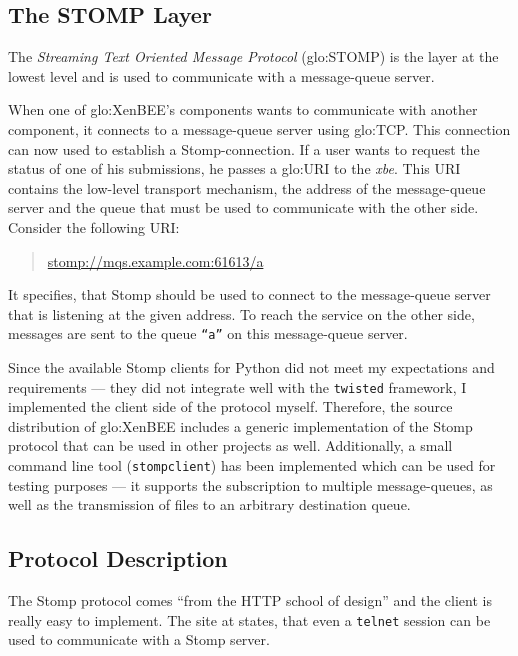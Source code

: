 \subsection{The STOMP Layer}
\label{sec:protocol:stomp}

The  \emph{Streaming  Text  Oriented Message  Protocol}  (\gls{glo:STOMP})
\cite{stomp} is the  layer at the lowest level and  is used to communicate
with  a  message-queue  server.

When  one  of  \gls{glo:XenBEE}'s  components wants  to  communicate  with
another   component,  it   connects  to   a  message-queue   server  using
\gls{glo:TCP}.    This   connection   can   now  used   to   establish   a
Stomp-connection. If  a user wants  to request the  status of one  of his
submissions,  he  passes a  \gls{glo:URI}  to  the  \emph{xbe}. This  URI
contains   the  low-level   transport  mechanism,   the  address   of  the
message-queue server and  the queue that must be  used to communicate with
the other side.  Consider the following URI:
\begin{quote}
  \url{stomp://mqs.example.com:61613/a}
\end{quote}
It specifies,  that Stomp should be  used to connect  to the message-queue
server that is listening at the given address. To reach the service on the
other  side,  messages  are  sent  to the  queue  \texttt{``a''}  on  this
message-queue server.

Since the available Stomp clients  for Python did not meet my expectations
and requirements --- they did not integrate well with the \texttt{twisted}
framework,  I  implemented  the   client  side  of  the  protocol  myself.
Therefore, the source distribution  of \gls{glo:XenBEE} includes a generic
implementation of the Stomp protocol that can be used in other projects as
well.  Additionally, a small  command line tool (\texttt{stompclient}) has
been implemented  which can be used  for testing purposes  --- it supports
the subscription  to multiple message-queues, as well  as the transmission
of files to an arbitrary destination queue.

\subsection*{Protocol Description}

The Stomp protocol comes ``from the HTTP school of design'' and the client
is really easy to implement. The  site at \cite{stomp} states, that even a
\texttt{telnet} session can be used to communicate with a Stomp server.

